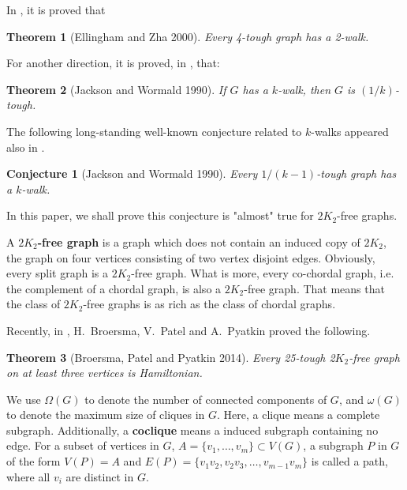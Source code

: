 \documentclass[12pt]{article}
\newtheorem{theorem}{Theorem}
\newtheorem{conjecture}{Conjecture}
\begin{document}
In \cite{ellingham2000toughness}, it is proved that
\begin{theorem}[Ellingham and Zha 2000]\label{cthm3}
Every 4-tough graph has a 2-walk.
\end{theorem}
For another direction, it is proved, in \cite{jackson1990k}, that:
\begin{theorem}[Jackson and Wormald 1990]\label{add}
If $G$ has a $k$-walk, then $G$ is $(1/k)$-tough.
\end{theorem}


The following long-standing well-known conjecture related to $k$-walks appeared also in \cite{jackson1990k}.
\begin{conjecture}[Jackson and Wormald 1990]\label{conj2}
Every $1/(k-1)$-tough graph has a $k$-walk.
\end{conjecture}



In this paper, we shall prove this conjecture is "almost" true for $2K_2$-free graphs.





A {\bf $2K_2$-free graph} is a graph which does not contain an induced copy of $2K_2$, the graph on four vertices consisting of two vertex disjoint edges.
 Obviously, every split graph is a $2K_2$-free graph. What is more, every co-chordal graph, i.e. the complement of a chordal graph, is also a $2K_2$-free graph. That means that the class of $2K_2$-free graphs is as rich as the class of chordal graphs.

Recently, in \cite{broersma2014toughness}, H.~Broersma, V.~Patel and A.~Pyatkin proved the following. 
\begin{theorem}[Broersma, Patel and Pyatkin 2014]\label{cthm6}
Every 25-tough 2$K_2$-free graph on at least three vertices is Hamiltonian.
\end{theorem}

We use $\Omega(G)$ to denote the number of connected components of $G$, and $\omega(G)$ to denote the maximum size of cliques in $G$. Here, a clique means a complete subgraph. Additionally, a {\bf coclique} means a induced subgraph containing no edge. For a subset of vertices in $G$, $A=\{v_1,\ldots,v_m\}\subset V(G)$, a subgraph $P$ in $G$ of the form $V(P)=A$ and $E(P)=\{v_1v_2,v_2v_3,\ldots,v_{m-1}v_m\}$ is called a path, where all $v_i$ are distinct in $G$.
\end{document}
